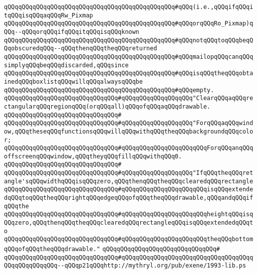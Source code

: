 \verb|qQQqqQQqqQQqqQQqqQQqqQQqqQQqqQQqqQQqqQQqqQQqqQQq#qQQq(i.e.,qQQqifqQQqitqQQqisqQQqaqQQqRw_Pixmap|\newline
\verb|qQQqqQQqqQQqqQQqqQQqqQQqqQQqqQQqqQQqqQQqqQQqqQQq#qQQqorqQQqRo_Pixmap)qQQq--qQQqorqQQqifqQQqitqQQqisqQQqknown|\newline
\verb|qQQqqQQqqQQqqQQqqQQqqQQqqQQqqQQqqQQqqQQqqQQqqQQq#qQQqnotqQQqtoqQQqbeqQQqobscuredqQQq--qQQqthenqQQqtheqQQqreturned|\newline
\verb|qQQqqQQqqQQqqQQqqQQqqQQqqQQqqQQqqQQqqQQqqQQqqQQq#qQQqmailopqQQqcanqQQqsimplyqQQqbeqQQqdiscarded,qQQqsince|\newline
\verb|qQQqqQQqqQQqqQQqqQQqqQQqqQQqqQQqqQQqqQQqqQQqqQQq#qQQqisqQQqtheqQQqobtainedqQQqboxlistqQQqwillqQQqalwaysqQQqbe|\newline
\verb|qQQqqQQqqQQqqQQqqQQqqQQqqQQqqQQqqQQqqQQqqQQqqQQq#qQQqempty.|\newline
\newline
\newline
\verb|qQQqqQQqqQQqqQQqqQQqqQQqqQQqqQQq#qQQqqQQqqQQqqQQqqQQq"ClearqQQqaqQQqrectangularqQQqregionqQQq(orqQQqall)qQQqofqQQqaqQQqdrawable.|\newline
\verb|qQQqqQQqqQQqqQQqqQQqqQQqqQQqqQQq#|\newline
\verb|qQQqqQQqqQQqqQQqqQQqqQQqqQQqqQQq#qQQqqQQqqQQqqQQqqQQq"ForqQQqaqQQqwindow,qQQqtheseqQQqfunctionsqQQqwillqQQqwithqQQqtheqQQqbackgroundqQQqcolor;|\newline
\verb|qQQqqQQqqQQqqQQqqQQqqQQqqQQqqQQq#qQQqqQQqqQQqqQQqqQQqqQQqForqQQqanqQQqoffscreenqQQqwindow,qQQqtheyqQQqfillqQQqwithqQQq0.|\newline
\verb|qQQqqQQqqQQqqQQqqQQqqQQqqQQqqQQq#|\newline
\verb|qQQqqQQqqQQqqQQqqQQqqQQqqQQqqQQq#qQQqqQQqqQQqqQQqqQQq"IfqQQqtheqQQqretangle'sqQQqwidthqQQqisqQQqzero,qQQqthenqQQqtheqQQqclearedqQQqrectangle|\newline
\verb|qQQqqQQqqQQqqQQqqQQqqQQqqQQqqQQq#qQQqqQQqqQQqqQQqqQQqqQQqisqQQqextendedqQQqtoqQQqtheqQQqrightqQQqedgeqQQqofqQQqtheqQQqdrawable,qQQqandqQQqifqQQqthe|\newline
\verb|qQQqqQQqqQQqqQQqqQQqqQQqqQQqqQQq#qQQqqQQqqQQqqQQqqQQqqQQqheightqQQqisqQQqzero,qQQqthenqQQqtheqQQqclearedqQQqrectangleqQQqisqQQqextendedqQQqto|\newline
\verb|qQQqqQQqqQQqqQQqqQQqqQQqqQQqqQQq#qQQqqQQqqQQqqQQqqQQqqQQqtheqQQqbottomqQQqofqQQqtheqQQqdrawable."|\newline
\verb|qQQqqQQqqQQqqQQqqQQqqQQqqQQqqQQq#|\newline
\verb|qQQqqQQqqQQqqQQqqQQqqQQqqQQqqQQq#qQQqqQQqqQQqqQQqqQQqqQQqqQQqqQQqqQQqqQQqqQQqqQQqqQQq--qQQqp21qQQqhttp://mythryl.org/pub/exene/1993-lib.ps|\newline
